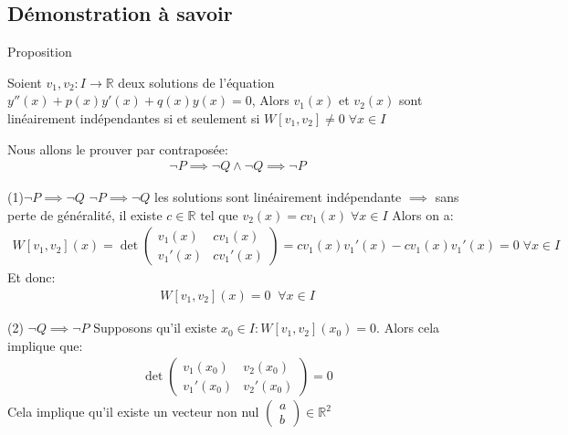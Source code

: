 \subsection{Démonstration à savoir}
\begin{parag}{Proposition}

    \begin{theoreme}
        Soient $v_1, v_2: I \to \mathbb{R}$ deux solutions de l'équation $y''(x) + p(x)y'(x) + q(x)y(x) = 0$, Alors $v_1(x)$ et $v_2(x)$ sont linéairement indépendantes si et seulement si $W[v_1, v_2] \neq 0 \; \forall x \in I$
    \end{theoreme}
Nous allons le prouver par contraposée:
\begin{align*}
    \neg P \implies \neg Q \wedge \neg Q \implies \neg P
\end{align*}
\begin{subparag}{(1)$ \neg P \implies \neg Q$}
    $\neg P \implies \neg Q$ les solutions sont linéairement indépendante $ \implies $ sans perte de généralité, il existe $c \in \mathbb{R} \text{ tel que } v_2(x) = cv_1(x) \; \forall x \in I$
    Alors on a:
    \begin{align*}
        W[v_1, v_2] (x) = \det \begin{pmatrix}
            v_1(x) & cv_1(x)  \\
            v_1'(x) & cv_1'(x)
        \end{pmatrix} = cv_1(x)v_1'(x) - cv_1(x)v_1'(x) = 0 \; \forall x \in I
    \end{align*}
    Et donc:
    \begin{align*}
        W[v_1, v_2] (x) = 0 \; \; \forall x \in I
    \end{align*}
\end{subparag}
\begin{subparag}{(2) $\neg Q \implies \neg P$}
    Supposons qu'il existe $x_0 \in I: W[v_1, v_2](x_0) = 0$. Alors cela implique que:
    \begin{align*}
        \det \begin{pmatrix}
            v_1(x_0) & v_2(x_0) \\
            v_1'(x_0) & v_2'(x_0)
        \end{pmatrix} = 0 
    \end{align*}
    Cela implique qu'il existe un vecteur non nul $ \begin{pmatrix}
        a \\b
    \end{pmatrix}\in \mathbb{R}^2$
    \begin{align*}

\end{align*}
\end{subparag}
\end{parag}
